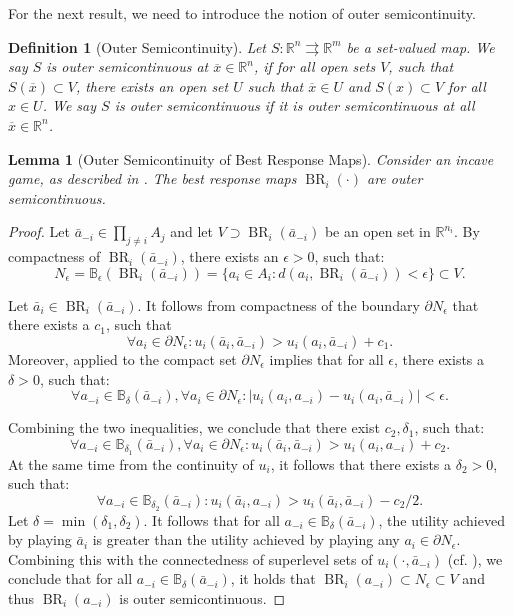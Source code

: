 \documentclass{article}
\newtheorem{lemma}{Lemma}
\newtheorem{definition}{Definition}[section]
\newcommand{\R}{\mathbb{R}}
\newcommand{\B}{\mathbb{B}}
\DeclareMathOperator{\BR}{BR}
\begin{document}
For the next result, we need to introduce the notion of outer semicontinuity.
\begin{definition}[Outer Semicontinuity]
    \label{def:osc}
    Let $S: \R^n \rightrightarrows \R^m$ be a set-valued map. We say $S$ is outer semicontinuous at $\overline{x}\in \R^n$, if for all open sets $V$, such that $S(\overline{x})\subset V$, there exists an open set $U$ such that $\overline{x}\in U$ and $S(x)\subset V$ for all $x\in U$. We say $S$ is outer semicontinuous if it is outer semicontinuous at all $\overline{x}\in \R^n$.
\end{definition}


\begin{lemma}[Outer Semicontinuity of Best Response Maps]
    \label{lem:osc}
    Consider an incave game, as described in . The best response maps $\BR_i(\cdot)$ are outer semicontinuous.
\end{lemma}
\begin{proof}
    Let $\bar{a}_{-i} \in \prod_{j\neq i} A_j$ and let $V \supset \BR_i(\bar{a}_{-i})$ be an open set in $\R^{n_i}$. By compactness of $\BR_i(\bar{a}_{-i})$, there exists an $\epsilon>0$, such that:
    \[
    N_\epsilon= \B_{\epsilon}(\BR_i(\bar{a}_{-i})) = \{ a_i \in A_i: d(a_i,\BR_i(\bar{a}_{-i}))<\epsilon \} \subset V.
    \]

    Let $\bar{a}_i \in \BR_i(\bar{a}_{-i})$. It follows from compactness of the boundary $\partial N_\epsilon$ that there exists a $c_1$, such that
    \[
    \forall a_i\in \partial N_\epsilon: u_i(\bar{a}_i,\bar{a}_{-i}) > u_i(a_i,\bar{a}_{-i}) +c_1.
    \]
    Moreover,  applied to the compact set $\partial N_\epsilon$ implies that for all $\epsilon$, there exists a $\delta>0$, such that:
    \[
    \forall a_{-i}\in \B_{\delta}(\bar{a}_{-i}), \forall a_i\in \partial N_\epsilon: |u_i(a_i,a_{-i}) - u_i(a_i,\bar{a}_{-i})| < \epsilon.
    \]

    Combining the two inequalities, we conclude that there exist  $c_2,\delta_1$, such that:
    \[
    \forall a_{-i}\in \B_{\delta_1}(\bar{a}_{-i}), \forall a_i\in \partial N_\epsilon: u_i(\bar{a}_i,\bar{a}_{-i}) > u_i(a_i,a_{-i}) + c_2.
    \]
    At the same time from the continuity of $u_i$, it follows that there exists a $\delta_2>0$, such that:
    \[
    \forall a_{-i}\in \B_{\delta_2}(\bar{a}_{-i}): u_i(\bar{a}_i,a_{-i}) > u_i(\bar{a}_i,\bar{a}_{-i}) - c_2/2.
    \]
    Let $\delta=\min(\delta_1,\delta_2)$. It follows that for all $a_{-i}\in \B_{\delta}(\bar{a}_{-i})$, the utility achieved by playing $\bar{a}_i$ is greater than the utility achieved by playing any $a_i\in \partial N_\epsilon$. Combining this with the connectedness of superlevel sets of $u_i(\cdot,\bar{a}_{-i})$ (cf. ), we conclude that for all $a_{-i}\in \B_{\delta}(\bar{a}_{-i})$, it holds that $\BR_i(a_{-i})\subset N_\epsilon \subset V$ and thus $\BR_i(a_{-i})$ is outer semicontinuous.
\end{proof}
\end{document}
